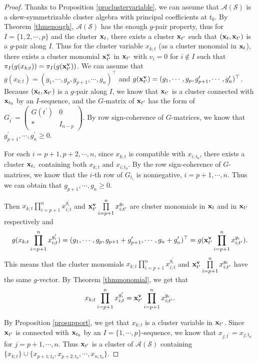 \documentclass[14pt]{amsart}
\begin{document}
 \begin{proof}
 Thanks to Proposition \ref{proclustervariable}, we can assume that $\mathcal A(\mathcal S)$ is a  skew-symmetrizable cluster algebra with principal coefficients at $t_0$. By Theorem \ref{thmenough}, $\mathcal A(\mathcal S)$ has the enough $g$-pair property, thus for $I=\{1,2,\cdots,p\}$ and the cluster ${\bf x}_t$, there exists a cluster ${\bf x}_{t^\prime}$ such that $({\bf x}_t,{\bf x}_{t^\prime})$ is a $g$-pair along $I$. Thus for
 the cluster variable $x_{k;t}$ (as a cluster monomial in ${\bf x}_t$), there exists a  cluster monomial ${\bf x}_{t^\prime}^{\bf v}$ in ${\bf x}_{t^\prime}$ with $v_i=0$ for $i\notin I$ such that $\pi_I(g(x_{k;t}))=\pi_I(g({\bf x}_{t^\prime}^{\bf v}))$.
 We can assume that $g(x_{k;t})=(g_1,\cdots,g_p,g_{p+1},\cdots,g_n)^{\top}$ and $g({\bf x}_{t^\prime}^{\bf v})=(g_1,\cdots,g_p,g_{p+1}^\prime,\cdots,g_n^\prime)^{\top}$.
  Because  $({\bf x}_t,{\bf x}_{t^\prime})$ is a $g$-pair along $I$, we know that ${\bf x}_{t^\prime}$ is a cluster connected with ${\bf x}_{t_0}$ by an $I$-sequence, and the $G$-matrix of ${\bf x}_{t^\prime}$ has the form of $G_{t^{\prime}}=\begin{pmatrix}G(t^{\prime})&0\\ \ast& I_{n-p}\end{pmatrix}$. By row sign-coherence of $G$-matrices, we know that $g_{p+1}^\prime,\cdots,g_n^\prime\geq 0$.



 For each $i=p+1,p+2,\cdots,n$, since $x_{k;t}$ is compatible with $x_{i;t_0}$, there exists a cluster ${\bf x}_{t_i}$ containing both $x_{k;t}$ and $x_{i;t_0}$. By  the row sign-coherence of $G$-matrices, we know that the $i$-th row of $G_{t_i}$ is nonnegative, $i=p+1,\cdots,n$. Thus we can obtain that $g_{p+1},\cdots,g_n\geq 0$.

 Then  $x_{k;t}\prod\limits_{i=p+1}^nx_{i;t}^{g_i^{\prime}}$ and ${\bf x}_{t^{\prime}}^{{\bf v}}\prod\limits_{i=p+1}^nx_{i;t^{\prime}}^{g_i}$ are cluster monomials in ${\bf x}_t$ and in ${\bf x}_{t^{\prime}}$ respectively and
\begin{eqnarray}
g(x_{k;t}\prod\limits_{i=p+1}^nx_{i;t}^{g_i^{\prime}})=(g_1,\cdots,g_p,g_{p+1}+g_{p+1}^{\prime},
\cdots,g_{n}+g_{n}^{\prime})^{\top}=g({\bf x}_{t^{\prime}}^{{\bf v}}\prod\limits_{i=p+1}^nx_{i;t^{\prime}}^{g_i}).\nonumber
\end{eqnarray}
This means that the cluster monomials $x_{k;t}\prod\limits_{i=p+1}^nx_{i;t}^{g_i^{\prime}}$ and ${\bf x}_{t^{\prime}}^{{\bf v}}\prod\limits_{i=p+1}^nx_{i;t^{\prime}}^{g_i}$ have the same $g$-vector. By Theorem \ref{thmmonomial}, we get that
$$x_{k;t}\prod\limits_{i=p+1}^nx_{i;t}^{g_i^{\prime}}={\bf x}_{t^{\prime}}^{{\bf v}}\prod\limits_{i=p+1}^nx_{i;t^{\prime}}^{g_i}.$$

 By Proposition \ref{prosupport}, we get that $x_{k;t}$ is a cluster variable in ${\bf x}_{t^\prime}$. Since ${\bf x}_{t^\prime}$ is connected with ${\bf x}_{t_0}$ by an $I=\{1,\cdots,p\}$-sequence, we know that $x_{j;t^\prime}=x_{j;t_0}$ for $j=p+1,\cdots,n$. Thus ${\bf x}_{t^\prime}$ is a cluster of $\mathcal A(\mathcal S)$ containing $\{x_{k;t}\}\cup\{x_{p+1;t_0},x_{p+2;t_0},\cdots,x_{n;t_0}\}$.
 \end{proof}
\end{document}
